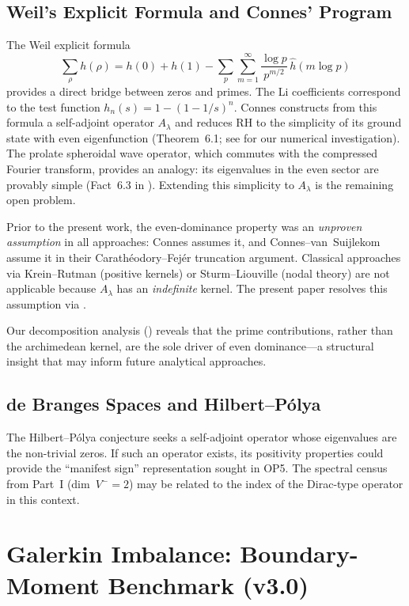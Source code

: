 \documentclass[12pt,a4paper]{article}
\theoremstyle{definition}
\theoremstyle{remark}
\begin{document}
\subsection{Weil's Explicit Formula and Connes' Program}
The Weil explicit formula
\[ \sum_\rho h(\rho) = h(0) + h(1) - \sum_p \sum_{m=1}^\infty \frac{\log p}{p^{m/2}}\,\hat{h}(m\log p) \]
provides a direct bridge between zeros and primes. The Li coefficients correspond to the test function $h_n(s) = 1-(1-1/s)^n$. Connes \cite{Connes2026} constructs from this formula a self-adjoint operator $A_\lambda$ and reduces RH to the simplicity of its ground state with even eigenfunction (Theorem~6.1; see  for our numerical investigation). The prolate spheroidal wave operator, which commutes with the compressed Fourier transform, provides an analogy: its eigenvalues in the even sector are provably simple (Fact~6.3 in \cite{Connes2026}). Extending this simplicity to $A_\lambda$ is the remaining open problem.

Prior to the present work, the even-dominance property was an \emph{unproven assumption} in all approaches: Connes \cite{Connes2026} assumes it, and Connes--van~Suijlekom \cite{ConnesvS2025} assume it in their Carath\'eodory--Fej\'er truncation argument. Classical approaches via Krein--Rutman (positive kernels) or Sturm--Liouville (nodal theory) are not applicable because $A_\lambda$ has an \emph{indefinite} kernel. The present paper resolves this assumption via .

Our decomposition analysis () reveals that the prime contributions, rather than the archimedean kernel, are the sole driver of even dominance---a structural insight that may inform future analytical approaches.

\subsection{de Branges Spaces and Hilbert--P\'olya}
The Hilbert--P\'olya conjecture seeks a self-adjoint operator whose eigenvalues are the non-trivial zeros. If such an operator exists, its positivity properties could provide the ``manifest sign'' representation sought in OP5. The spectral census from Part~I (dim~$V^- = 2$) may be related to the index of the Dirac-type operator in this context.


\section{Galerkin Imbalance: Boundary-Moment Benchmark (v3.0)}
\label{sec:gf1}
\end{document}
